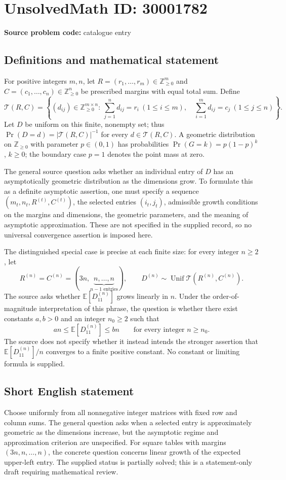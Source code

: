 \documentclass[11pt]{article}
\newcommand{\Z}{\mathbb{Z}}
\newcommand{\E}{\mathbb{E}}
\begin{document}
\section*{UnsolvedMath ID: 30001782}
\textbf{Source problem code:} catalogue entry
\subsection{Definitions and mathematical statement}
For positive integers \(m,n\), let \(R=(r_1,\ldots,r_m)\in\Z_{\geq0}^{m}\) and \(C=(c_1,\ldots,c_n)\in\Z_{\geq0}^{n}\) be prescribed margins with equal total sum. Define
\[
\mathcal T(R,C)=\left\{(d_{ij})\in\Z_{\geq0}^{m\times n}:\ \sum_{j=1}^{n}d_{ij}=r_i\ (1\leq i\leq m),\quad \sum_{i=1}^{m}d_{ij}=c_j\ (1\leq j\leq n)\right\}.
\]
Let \(D\) be uniform on this finite, nonempty set; thus \(\Pr(D=d)=|\mathcal T(R,C)|^{-1}\) for every \(d\in\mathcal T(R,C)\). A geometric distribution on \(\Z_{\geq0}\) with parameter \(p\in(0,1)\) has probabilities \(\Pr(G=k)=p(1-p)^k\), \(k\geq0\); the boundary case \(p=1\) denotes the point mass at zero.

The general source question asks whether an individual entry of \(D\) has an asymptotically geometric distribution as the dimensions grow. To formulate this as a definite asymptotic assertion, one must specify a sequence \((m_t,n_t,R^{(t)},C^{(t)})\), the selected entries \((i_t,j_t)\), admissible growth conditions on the margins and dimensions, the geometric parameters, and the meaning of asymptotic approximation. These are not specified in the supplied record, so no universal convergence assertion is imposed here.

The distinguished special case is precise at each finite size: for every integer \(n\geq2\), let
\[
R^{(n)}=C^{(n)}=(3n,\underbrace{n,\ldots,n}_{n-1\text{ entries}}),\qquad D^{(n)}\sim\operatorname{Unif}\mathcal T(R^{(n)},C^{(n)}).
\]
The source asks whether \(\E[D^{(n)}_{11}]\) grows linearly in \(n\). Under the order-of-magnitude interpretation of this phrase, the question is whether there exist constants \(a,b>0\) and an integer \(n_0\geq2\) such that
\[
 a n\leq \E[D^{(n)}_{11}]\leq b n\qquad\text{for every integer }n\geq n_0.
\]
The source does not specify whether it instead intends the stronger assertion that \(\E[D^{(n)}_{11}]/n\) converges to a finite positive constant. No constant or limiting formula is supplied.
\subsection{Short English statement}
Choose uniformly from all nonnegative integer matrices with fixed row and column sums. The general question asks when a selected entry is approximately geometric as the dimensions increase, but the asymptotic regime and approximation criterion are unspecified. For square tables with margins \((3n,n,\ldots,n)\), the concrete question concerns linear growth of the expected upper-left entry. The supplied status is partially solved; this is a statement-only draft requiring mathematical review.
\end{document}
